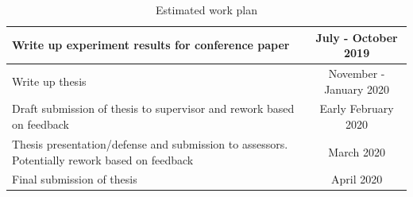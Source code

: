 \message{ !name(usyd_phd_proposal.tex)}\documentclass{article} \usepackage{tabularx}
\begin{document}
\begin{table}[H]
\begin{tabularx}{\textwidth}{|X|l|}
			Write up experiment results for conference paper &
                                                         \multicolumn{1}{c|}{July - October 2019}                \\ \hline
			Write up thesis & \multicolumn{1}{c|}{November - January 2020}         \\ \hline
			Draft submission of thesis to supervisor and rework based on feedback                          & \multicolumn{1}{c|}{Early February 2020}              \\ \hline
			Thesis presentation/defense and submission to assessors. Potentially rework based on feedback  & \multicolumn{1}{c|}{March 2020}      		     \\ \hline
			Final submission of thesis                                                                     & \multicolumn{1}{c|}{April 2020}		             \\ \hline
		\end{tabularx}
		\caption{Estimated work plan}
	\end{table}

	
 
\end{document}
